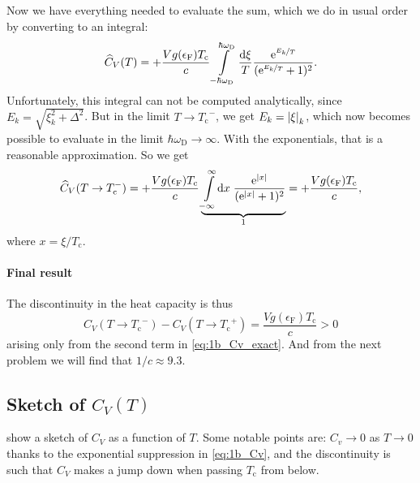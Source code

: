 \documentclass[11pt,letter, swedish, english
]{article}
\newcommand{\Tc}{\ensuremath{T_{\text{c}}}}
\newcommand{\eF}{\ensuremath{\epsilon_{\text{F}}}}
\newcommand{\wD}{\ensuremath{\omega_{\text{D}}}}
\begin{document}
Now we have everything needed to evaluate the sum, which we do in
usual order by converting to an integral:
\begin{equation}
\widehat{C}_V(T) = +\frac{Vg(\eF)\Tc}{c}
\int_{-\hbar\wD}^{\hbar\wD}\frac{\rd\xi}{T}
\frac{\ee^{\nicefrac{E_k}{T}}}{(\ee^{\nicefrac{E_k}{T}}+1)^2}.
\end{equation}
Unfortunately, this integral can not be computed analytically, since
$E_k=\sqrt{\xi_k^2+\Delta^2}$. But in the limit $T\to\Tc^-$, we get
$E_k=\abs{\xi}_k$, which now becomes possible to evaluate in the limit
$\hbar\wD\to\infty$. With the exponentials, that is a reasonable
approximation. So we get
\begin{equation}
\widehat{C}_V(T\to\Tc^-) = +\frac{Vg(\eF)\Tc}{c}
\underbrace{\int_{-\infty}^{\infty}\!\rd{x}\;
\frac{\ee^{|x|}}{(\ee^{|x|}+1)^2}}_{1}
= +\frac{Vg(\eF)\Tc}{c},
\end{equation}
where $x=\xi/\Tc$.

\paragraph{Final result}
The discontinuity in the heat capacity is thus
\begin{equation}
C_V(T\to\Tc^-)-C_V(T\to\Tc^+)=\frac{Vg(\eF)\Tc}{c}>0
\end{equation}
arising only from the second term in \eqref{eq:1b_Cv_exact}. And from
the next problem we will find that $1/c\approx9.3$.

\subsection{Sketch of $C_V(T)$}
 show a sketch of $C_V$ as a function of $T$. Some
notable points are: $C_v\to0$ as $T\to0$ thanks to the exponential
suppression in \eqref{eq:1b_Cv}, and the discontinuity is such that
$C_V$ makes a jump down when passing $\Tc$ from below.


\begin{figure}
\centering
\resizebox{.7\textwidth}{!}{}
\caption{}
\label{fig:1_Cv}
\end{figure}
\end{document}
